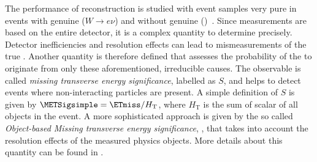 The performance of \ETmiss reconstruction is studied with event samples very pure in events with genuine \ETmiss ($W \rightarrow e\nu$) and without genuine \ETmiss (\Zmumu)~\cite{PERF-2016-07}.
Since \ETmiss measurements are based on the entire detector, it is a complex quantity to determine precisely. Detector inefficiencies and resolution effects can lead to mismeasurements of the true \ETmiss.
Another quantity is therefore defined that assesses the probability of the \ETmiss to originate from only these aforementioned, irreducible causes.
The observable is called \emph{missing transverse energy significance}, labelled as $S$, and helps to detect events where non-interacting particles are present.
A simple definition of $S$ is given by $\METSigsimple = \ETmiss / H_{\text{T}}$, where $H_{\text{T}}$ is the sum of scalar \pT of all objects in the event.
A more sophisticated approach is given by the so called \emph{Object-based Missing transverse energy significance}, \METSigobject, that takes into account the resolution effects of the measured physics objects.
More details about this quantity can be found in .





